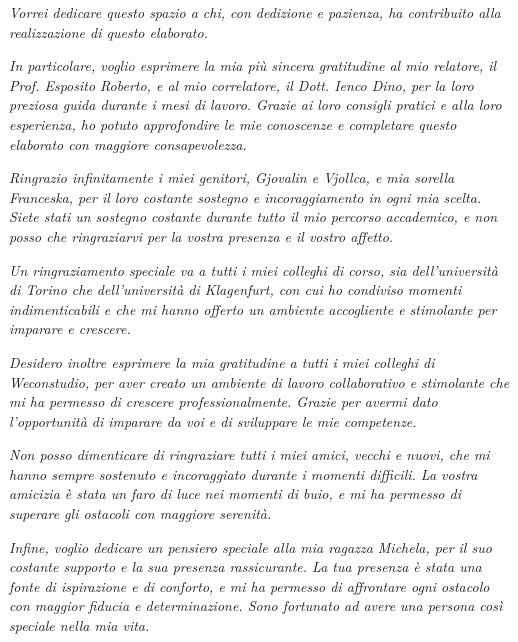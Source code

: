 \thispagestyle{empty}
\vspace*{\fill}

\textit{Vorrei dedicare questo spazio a chi, con dedizione e pazienza, ha contribuito alla realizzazione di questo elaborato.} 

\textit{In particolare, voglio esprimere la mia più sincera gratitudine al mio relatore, il Prof. Esposito Roberto, e al mio correlatore, il Dott. Ienco Dino, per la loro preziosa guida durante i mesi di lavoro. Grazie ai loro consigli pratici e alla loro esperienza, ho potuto approfondire le mie conoscenze e completare questo elaborato con maggiore consapevolezza.}

\textit{Ringrazio infinitamente i miei genitori, \emph{Gjovalin} e Vjollca, e mia sorella\\ Franceska, per il loro costante sostegno e incoraggiamento in ogni mia scelta. Siete stati un sostegno costante durante tutto il mio percorso accademico, e non posso che ringraziarvi per la vostra presenza e il vostro affetto.}

\textit{Un ringraziamento speciale va a tutti i miei colleghi di corso, sia dell'università di Torino che dell'università di Klagenfurt, con cui ho condiviso momenti indimenticabili e che mi hanno offerto un ambiente accogliente e stimolante per imparare e crescere.}

\textit{Desidero inoltre esprimere la mia gratitudine a tutti i miei colleghi di Weconstudio, per aver creato un ambiente di lavoro collaborativo e stimolante che mi ha permesso di crescere professionalmente. Grazie per avermi dato l'opportunità di imparare da voi e di sviluppare le mie competenze.}

\textit{Non posso dimenticare di ringraziare tutti i miei amici, vecchi e nuovi, che mi hanno sempre sostenuto e incoraggiato durante i momenti difficili. La vostra amicizia è stata un faro di luce nei momenti di buio, e mi ha permesso di superare gli ostacoli con maggiore serenità.} 

\textit{Infine, voglio dedicare un pensiero speciale alla mia ragazza Michela, per il suo costante supporto e la sua presenza rassicurante. La tua presenza è stata una fonte di ispirazione e di conforto, e mi ha permesso di affrontare ogni ostacolo con maggior fiducia e determinazione. Sono fortunato ad avere una persona così speciale nella mia vita.}

\vspace*{\fill}

